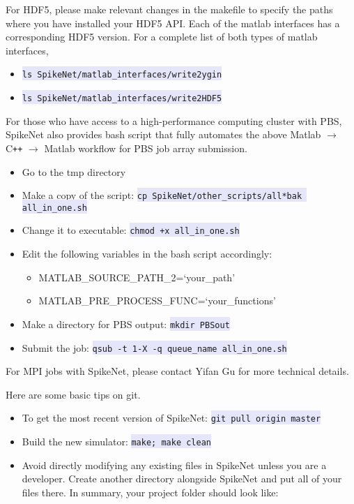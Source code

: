 \documentclass{article}
\newcommand{\mylstinline}[1] {\colorbox{Lavender}{\lstinline[basicstyle=\ttfamily\footnotesize\color{Black}]|#1|} }
\begin{document}
For HDF5, please make relevant changes in the makefile to specify the paths where you have installed your HDF5 API. Each of the matlab interfaces has a corresponding HDF5 version. For a complete list of both types of matlab interfaces,  
\begin{itemize}
\item \mylstinline{ls SpikeNet/matlab_interfaces/write2ygin}
\item \mylstinline{ls SpikeNet/matlab_interfaces/write2HDF5}
\end{itemize}


For those who have access to a high-performance computing cluster with PBS, SpikeNet also provides bash script that fully automates the above Matlab $\rightarrow$  C\texttt{++}  $\rightarrow$ Matlab workflow for PBS job array submission. 
\begin{itemize}
\item Go to the tmp directory
\item Make a copy of the script: \mylstinline{cp SpikeNet/other_scripts/all*bak all_in_one.sh}
\item Change it to executable: \mylstinline{chmod +x all_in_one.sh}
\item Edit the following variables in the bash script accordingly: 
\begin{itemize}
\item {\footnotesize MATLAB\_SOURCE\_PATH\_2=`your\_path'}
\item {\footnotesize MATLAB\_PRE\_PROCESS\_FUNC=`your\_functions'}
\end{itemize}
\item Make a directory for PBS output: \mylstinline{mkdir PBSout}
\item Submit the job: \mylstinline{qsub -t 1-X -q queue_name all_in_one.sh}
\end{itemize}

For MPI jobs with SpikeNet, please contact Yifan Gu for more technical details.

Here are some basic tips on git.
\begin{itemize}
\item To get the most recent version of SpikeNet: \mylstinline{git pull origin master}
\item Build the new simulator: \mylstinline{make; make clean}
\item Avoid directly modifying any existing files in SpikeNet unless you are a developer. Create another directory alongside SpikeNet and put all of your files there. In summary, your project folder should look like:
\end{itemize}
\hfill\begin{minipage}{\dimexpr\textwidth-1cm}
\xdef\tpd{\the\prevdepth}
\end{minipage}
\end{document}
